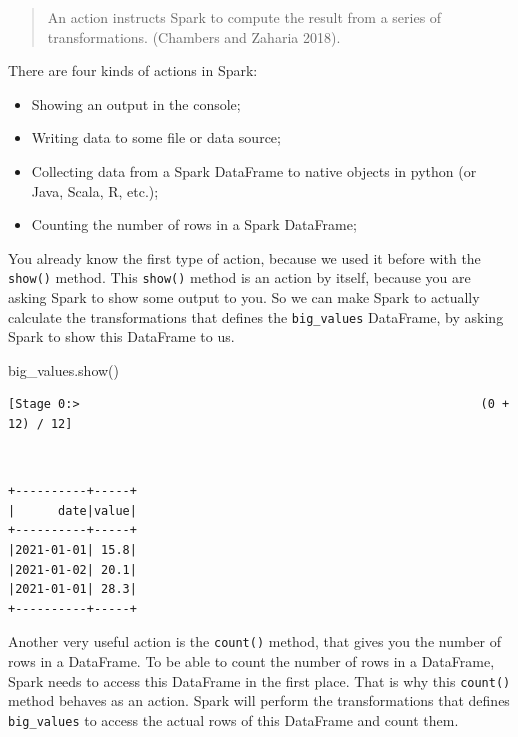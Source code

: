 \documentclass[
  11pt,
  letterpaper,
  DIV=11,
  numbers=noendperiod]{scrreprt}
\newenvironment{Shaded}{\begin{snugshade}}{\end{snugshade}}
\newcommand{\NormalTok}[1]{\textcolor[rgb]{0.00,0.23,0.31}{#1}}
\providecommand{\tightlist}{%
  \setlength{\itemsep}{0pt}\setlength{\parskip}{0pt}}\usepackage{longtable,booktabs,array}
\begin{document}
\begin{quote}
An action instructs Spark to compute the result from a series of
transformations. (Chambers and Zaharia 2018).
\end{quote}

There are four kinds of actions in Spark:

\begin{itemize}
\tightlist
\item
  Showing an output in the console;
\item
  Writing data to some file or data source;
\item
  Collecting data from a Spark DataFrame to native objects in python (or
  Java, Scala, R, etc.);
\item
  Counting the number of rows in a Spark DataFrame;
\end{itemize}

You already know the first type of action, because we used it before
with the \texttt{show()} method. This \texttt{show()} method is an
action by itself, because you are asking Spark to show some output to
you. So we can make Spark to actually calculate the transformations that
defines the \texttt{big\_values} DataFrame, by asking Spark to show this
DataFrame to us.

\begin{Shaded}
\begin{Highlighting}[]
\NormalTok{big\_values.show()}
\end{Highlighting}
\end{Shaded}

\begin{verbatim}
[Stage 0:>                                                        (0 + 12) / 12]
\end{verbatim}

\begin{verbatim}
                                                                                
\end{verbatim}

\begin{verbatim}
+----------+-----+
|      date|value|
+----------+-----+
|2021-01-01| 15.8|
|2021-01-02| 20.1|
|2021-01-01| 28.3|
+----------+-----+
\end{verbatim}

Another very useful action is the \texttt{count()} method, that gives
you the number of rows in a DataFrame. To be able to count the number of
rows in a DataFrame, Spark needs to access this DataFrame in the first
place. That is why this \texttt{count()} method behaves as an action.
Spark will perform the transformations that defines \texttt{big\_values}
to access the actual rows of this DataFrame and count them.
\end{document}
